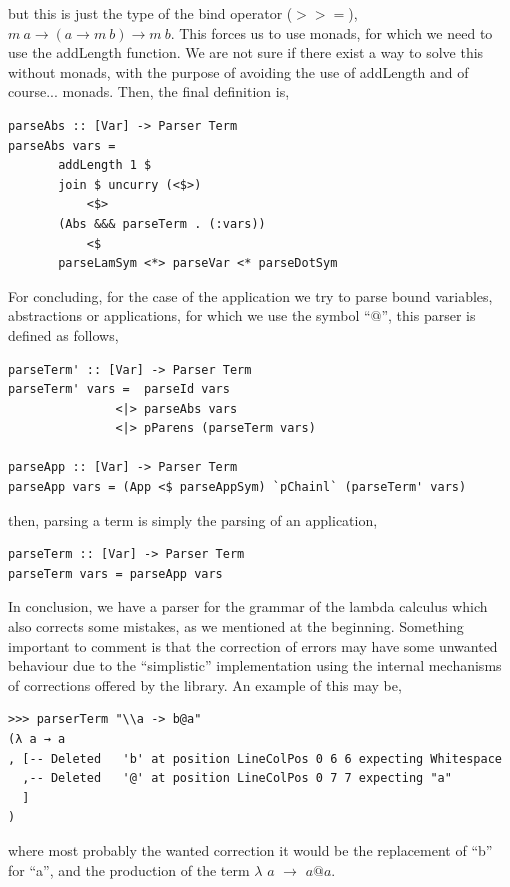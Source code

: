 \documentclass[a4paper,10pt]{article}
\begin{document}
\noindent
but this is just the type of the bind operator ($>>=$), $m \ a \rightarrow (a \rightarrow m \ b) \rightarrow m \ b$. This forces us to use monads, for which we need to use the addLength function.
We are not sure if there exist a way to solve this without monads, with the purpose of avoiding the
use of addLength and of course... monads. Then, the final definition is,

\begin{lstlisting}
parseAbs :: [Var] -> Parser Term
parseAbs vars = 
       addLength 1 $
       join $ uncurry (<$>) 
           <$> 
       (Abs &&& parseTerm . (:vars))
       	   <$ 
       parseLamSym <*> parseVar <* parseDotSym
\end{lstlisting}

For concluding, for the case of the application we try to parse bound variables, abstractions
or applications, for which we use the symbol ``$@$'', this parser is defined as follows,

\begin{lstlisting}
parseTerm' :: [Var] -> Parser Term
parseTerm' vars =  parseId vars
               <|> parseAbs vars
               <|> pParens (parseTerm vars)

parseApp :: [Var] -> Parser Term
parseApp vars = (App <$ parseAppSym) `pChainl` (parseTerm' vars)
\end{lstlisting}

then, parsing a term is simply the parsing of an application,

\begin{lstlisting}
parseTerm :: [Var] -> Parser Term
parseTerm vars = parseApp vars
\end{lstlisting}

In conclusion, we have a parser for the grammar of the lambda calculus which also corrects some
mistakes, as we mentioned at the beginning. Something important to comment is that the
correction of errors may have some unwanted behaviour due to the ``simplistic''
implementation using the internal mechanisms of corrections offered by the library. An example
of this may be,

\begin{verbatim}
>>> parserTerm "\\a -> b@a"
(λ a → a
, [-- Deleted   'b' at position LineColPos 0 6 6 expecting Whitespace
  ,-- Deleted   '@' at position LineColPos 0 7 7 expecting "a"
  ]
)
\end{verbatim}

where most probably the wanted correction it would be the replacement of ``b'' for
``a'', and the production of the term $\lambda$ $a$ $\rightarrow$ $a@a$.
\end{document}
